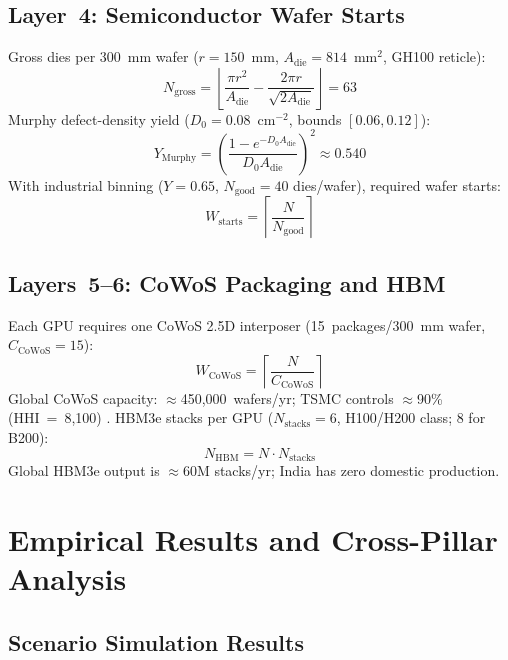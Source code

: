 \documentclass[conference]{IEEEtran}
\begin{document}
\subsection{Layer~4: Semiconductor Wafer Starts}

Gross dies per 300~mm wafer ($r=150$~mm, $A_{\text{die}}=814$~mm$^2$, GH100 reticle):
\begin{equation}
  N_{\text{gross}} = \left\lfloor \frac{\pi r^{2}}{A_{\text{die}}} - \frac{2\pi r}{\sqrt{2A_{\text{die}}}} \right\rfloor = 63
  \label{eq:gross}
\end{equation}
Murphy defect-density yield ($D_0 = 0.08$~cm$^{-2}$, bounds $[0.06, 0.12]$):
\begin{equation}
  Y_{\text{Murphy}} = \left( \frac{1 - e^{-D_0 A_{\text{die}}}}{D_0 A_{\text{die}}} \right)^2 \approx 0.540
  \label{eq:murphy}
\end{equation}
With industrial binning ($Y = 0.65$, $N_{\text{good}} = 40$ dies/wafer), required wafer starts:
\begin{equation}
  W_{\text{starts}} = \left\lceil \frac{N}{N_{\text{good}}} \right\rceil
  \label{eq:wafers}
\end{equation}

\subsection{Layers~5--6: CoWoS Packaging and HBM}

Each GPU requires one CoWoS 2.5D interposer (15~packages/300~mm wafer, $C_{\text{CoWoS}}=15$):
\begin{equation}
  W_{\text{CoWoS}} = \left\lceil \frac{N}{C_{\text{CoWoS}}} \right\rceil
  \label{eq:cowos}
\end{equation}
Global CoWoS capacity: $\approx$450{,}000~wafers/yr; TSMC controls $\approx$90\% (HHI~=~8{,}100) \cite{trendforce2026foundry}. HBM3e stacks per GPU ($N_{\text{stacks}} = 6$, H100/H200 class; 8 for B200):
\begin{equation}
  N_{\text{HBM}} = N \cdot N_{\text{stacks}}
  \label{eq:hbm}
\end{equation}
Global HBM3e output is $\approx$60M stacks/yr; India has zero domestic production.

\section{Empirical Results and Cross-Pillar Analysis}

\subsection{Scenario Simulation Results}
\end{document}
